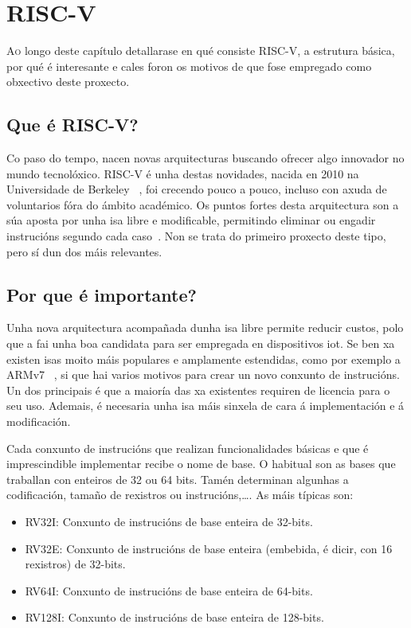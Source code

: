 \chapter{RISC-V}
\label{chap:riscv}

\lettrine{A}{o} longo deste capítulo detallarase en qué consiste RISC-V, a estrutura básica, por qué é interesante e cales foron os motivos de que fose empregado como obxectivo deste proxecto.

\section{Que é RISC-V?}\label{sec:que_riscv}
Co paso do tempo, nacen novas arquitecturas buscando ofrecer algo innovador no mundo tecnolóxico. RISC-V é unha destas novidades, nacida en 2010 na Universidade de Berkeley ~\cite{WikipediaRISCV}, foi crecendo pouco a pouco, incluso con axuda de voluntarios fóra do ámbito académico. Os puntos fortes desta arquitectura son a súa aposta por unha \acrshort{isa} libre e modificable, permitindo eliminar ou engadir instrucións segundo cada caso~\cite{RISCV_IoT}. Non se trata do primeiro proxecto deste tipo, pero sí dun dos máis relevantes. 

\section{Por que é importante?}\label{sec:imp_riscv}
Unha nova arquitectura acompañada dunha \acrshort{isa} libre permite reducir custos, polo que a fai unha boa candidata para ser empregada en dispositivos \acrshort{iot}. Se ben xa existen \acrshort{isa}s moito máis populares e amplamente estendidas, como por exemplo a ARMv7 ~\cite{Waterman:EECS-2016-1}, si que hai varios motivos para crear un novo conxunto de instrucións. Un dos principais é que a maioría das xa existentes requiren de licencia para o seu uso. Ademais, é necesaria unha \acrshort{isa} máis sinxela de cara á implementación e á modificación. 

Cada conxunto de instrucións que realizan funcionalidades básicas e que é imprescindible implementar recibe o nome de base. O habitual son as bases que traballan con enteiros de 32 ou 64 \gls{bits}. Tamén determinan algunhas a codificación, tamaño de rexistros ou instrucións,\dots. As máis típicas son: 
\begin{itemize}
    \item RV32I: Conxunto de instrucións de base enteira de 32-bits.
    \item RV32E: Conxunto de instrucións de base enteira (embebida, é dicir, con 16 rexistros) de 32-bits.
    \item RV64I: Conxunto de instrucións de base enteira de 64-bits.
    \item RV128I: Conxunto de instrucións de base enteira de 128-bits.
\end{itemize}

